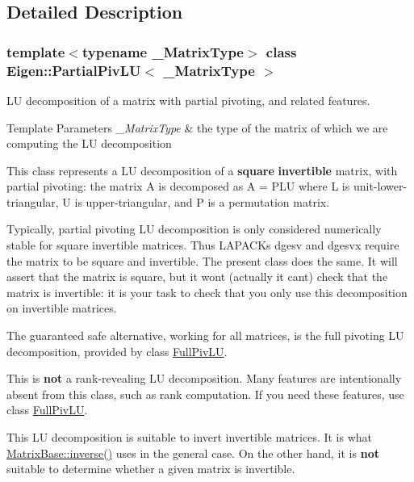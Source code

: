 \subsection{Detailed Description}
\subsubsection*{template$<$typename \+\_\+\+Matrix\+Type$>$\newline
class Eigen\+::\+Partial\+Piv\+L\+U$<$ \+\_\+\+Matrix\+Type $>$}

LU decomposition of a matrix with partial pivoting, and related features. 


\begin{DoxyTemplParams}{Template Parameters}
{\em \+\_\+\+Matrix\+Type} & the type of the matrix of which we are computing the LU decomposition\\
\hline
\end{DoxyTemplParams}
This class represents a LU decomposition of a {\bfseries{square}} {\bfseries{invertible}} matrix, with partial pivoting\+: the matrix A is decomposed as A = P\+LU where L is unit-\/lower-\/triangular, U is upper-\/triangular, and P is a permutation matrix.

Typically, partial pivoting LU decomposition is only considered numerically stable for square invertible matrices. Thus L\+A\+P\+A\+CK\textquotesingle{}s dgesv and dgesvx require the matrix to be square and invertible. The present class does the same. It will assert that the matrix is square, but it won\textquotesingle{}t (actually it can\textquotesingle{}t) check that the matrix is invertible\+: it is your task to check that you only use this decomposition on invertible matrices.

The guaranteed safe alternative, working for all matrices, is the full pivoting LU decomposition, provided by class \mbox{\hyperlink{class_eigen_1_1_full_piv_l_u}{Full\+Piv\+LU}}.

This is {\bfseries{not}} a rank-\/revealing LU decomposition. Many features are intentionally absent from this class, such as rank computation. If you need these features, use class \mbox{\hyperlink{class_eigen_1_1_full_piv_l_u}{Full\+Piv\+LU}}.

This LU decomposition is suitable to invert invertible matrices. It is what \mbox{\hyperlink{class_eigen_1_1_matrix_base_a7712eb69e8ea3c8f7b8da1c44dbdeebf}{Matrix\+Base\+::inverse()}} uses in the general case. On the other hand, it is {\bfseries{not}} suitable to determine whether a given matrix is invertible.

